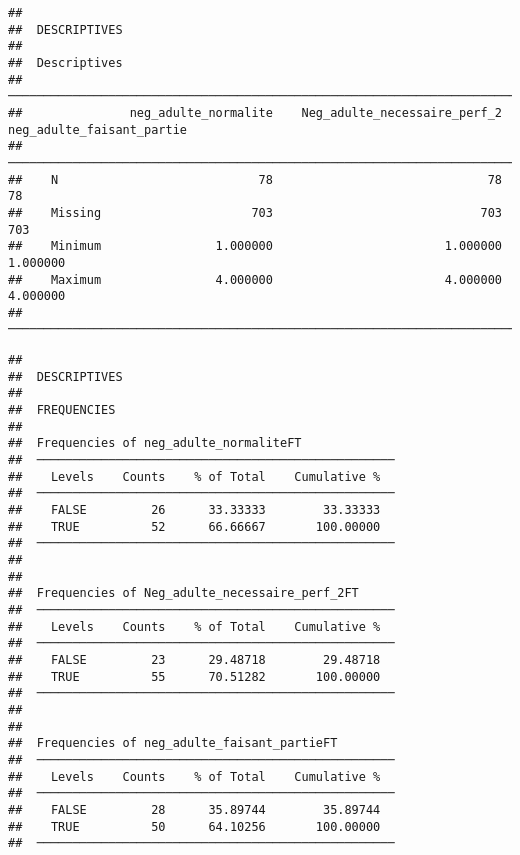\documentclass[
]{article}
\begin{document}
\begin{verbatim}
## 
##  DESCRIPTIVES
## 
##  Descriptives                                                                                     
##  ──────────────────────────────────────────────────────────────────────────────────────────────── 
##               neg_adulte_normalite    Neg_adulte_necessaire_perf_2    neg_adulte_faisant_partie   
##  ──────────────────────────────────────────────────────────────────────────────────────────────── 
##    N                            78                              78                           78   
##    Missing                     703                             703                          703   
##    Minimum                1.000000                        1.000000                     1.000000   
##    Maximum                4.000000                        4.000000                     4.000000   
##  ────────────────────────────────────────────────────────────────────────────────────────────────
\end{verbatim}

\begin{verbatim}
## 
##  DESCRIPTIVES
## 
##  FREQUENCIES
## 
##  Frequencies of neg_adulte_normaliteFT              
##  ────────────────────────────────────────────────── 
##    Levels    Counts    % of Total    Cumulative %   
##  ────────────────────────────────────────────────── 
##    FALSE         26      33.33333        33.33333   
##    TRUE          52      66.66667       100.00000   
##  ────────────────────────────────────────────────── 
## 
## 
##  Frequencies of Neg_adulte_necessaire_perf_2FT      
##  ────────────────────────────────────────────────── 
##    Levels    Counts    % of Total    Cumulative %   
##  ────────────────────────────────────────────────── 
##    FALSE         23      29.48718        29.48718   
##    TRUE          55      70.51282       100.00000   
##  ────────────────────────────────────────────────── 
## 
## 
##  Frequencies of neg_adulte_faisant_partieFT         
##  ────────────────────────────────────────────────── 
##    Levels    Counts    % of Total    Cumulative %   
##  ────────────────────────────────────────────────── 
##    FALSE         28      35.89744        35.89744   
##    TRUE          50      64.10256       100.00000   
##  ──────────────────────────────────────────────────
\end{verbatim}
\end{document}
